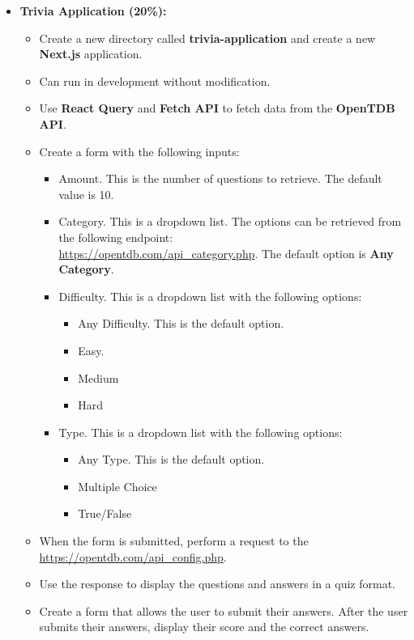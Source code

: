 \documentclass{article}
\begin{document}
	\begin{itemize}
	\item \textbf{Trivia Application (20\%):}
	\begin{itemize}
		\item Create a new directory called \textbf{trivia-application} and create a new \textbf{Next.js} application.
		\item Can run in development without modification.
		\item Use \textbf{React Query} and \textbf{Fetch API} to fetch data from the \textbf{OpenTDB API}.
		\item Create a form with the following inputs:
		\begin{itemize}
			\item Amount. This is the number of questions to retrieve. The default value is 10.
			\item Category. This is a dropdown list. The options can be retrieved from the following endpoint:\\
			\href{https://opentdb.com/api\_category.php}{https://opentdb.com/api\_category.php}. The default option is \textbf{Any Category}.			
			\item Difficulty. This is a dropdown list with the following options:
			\begin{itemize}
				\item Any Difficulty. This is the default option.
				\item Easy. 
				\item Medium
				\item Hard
			\end{itemize}
			\item Type. This is a dropdown list with the following options:
			\begin{itemize}
				\item Any Type. This is the default option.
				\item Multiple Choice
				\item True/False
			\end{itemize}
		\end{itemize}
		\item When the form is submitted, perform a request to the \href{OpenTDB API}{https://opentdb.com/api\_config.php}. 
		\item Use the response to display the questions and answers in a quiz format. 
		\item Create a form that allows the user to submit their answers. After the user submits their answers, display their score and the correct answers.
	\end{itemize} 
\end{itemize}
\end{document}
